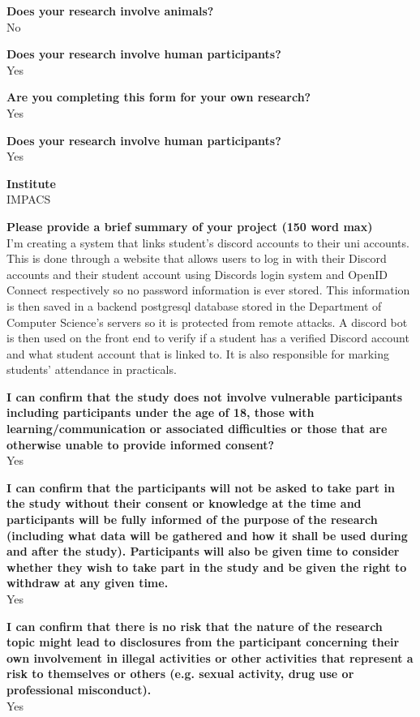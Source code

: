 \textbf{Does your research involve animals?}\\
No

\textbf{Does your research involve human participants?}\\
Yes

\textbf{Are you completing this form for your own research?}\\
Yes

\textbf{Does your research involve human participants?}\\
Yes

\textbf{Institute}\\
IMPACS

\textbf{Please provide a brief summary of your project (150 word max)}\\
I'm creating a system that links student's discord accounts to their uni accounts. This is done through a website that allows users to log in with their Discord accounts and their student account using Discords login system and OpenID Connect respectively so no password information is ever stored. This information is then saved in a backend postgresql database stored in the Department of Computer Science's servers so it is
protected from remote attacks. A discord bot is then used on the front end to verify if a student has a verified Discord account and what student account that is linked to. It is also responsible for marking students' attendance in practicals. 

\textbf{I can confirm that the study does not involve vulnerable participants including participants under the age of 18, those with learning/communication or associated difficulties or those that are otherwise unable to provide informed consent?}\\
Yes

\textbf{I can confirm that the participants will not be asked to take part in the study without their consent or knowledge at the time and participants will be fully informed of the purpose of the research (including what data will be gathered and how it shall be used during and after the study). Participants will also be given time to consider whether they wish to take part in the study and be given the right to withdraw at any given time.}\\
Yes

\textbf{I can confirm that there is no risk that the nature of the research topic might lead to disclosures from the participant concerning their own involvement in illegal activities or other activities that represent a risk to themselves or others (e.g. sexual activity, drug use or professional misconduct).}\\
Yes

